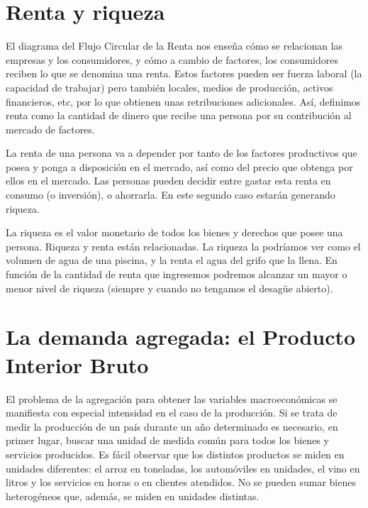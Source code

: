 \documentclass[
]{krantz}
\begin{document}
\hypertarget{renta-y-riqueza}{%
\section{Renta y riqueza}\label{renta-y-riqueza}}

El diagrama del Flujo Circular de la Renta nos enseña cómo se relacionan las empresas y los consumidores, y cómo a cambio de factores, los consumidores reciben lo que se denomina una renta. Estos factores pueden ser fuerza laboral (la capacidad de trabajar) pero también locales, medios de producción, activos financieros, etc, por lo que obtienen unas retribuciones adicionales. Así, definimos renta como la cantidad de dinero que recibe una persona por su contribución al mercado de factores.

La renta de una persona va a depender por tanto de los factores productivos que posea y ponga a disposición en el mercado, así como del precio que obtenga por ellos en el mercado. Las personas pueden decidir entre gastar esta renta en consumo (o inversión), o ahorrarla. En este segundo caso estarán generando riqueza.

La riqueza es el valor monetario de todos los bienes y derechos que posee una persona. Riqueza y renta están relacionadas. La riqueza la podríamos ver como el volumen de agua de una piscina, y la renta el agua del grifo que la llena. En función de la cantidad de renta que ingresemos podremos alcanzar un mayor o menor nivel de riqueza (siempre y cuando no tengamos el desagüe abierto).

\hypertarget{la-demanda-agregada-el-producto-interior-bruto}{%
\section{La demanda agregada: el Producto Interior Bruto}\label{la-demanda-agregada-el-producto-interior-bruto}}

El problema de la agregación para obtener las variables macroeconómicas se manifiesta con especial intensidad en el caso de la producción. Si se trata de medir la producción de un país durante un año determinado es necesario, en primer lugar, buscar una unidad de medida común para todos los bienes y servicios producidos. Es fácil observar que los distintos productos se miden en unidades diferentes: el arroz en toneladas, los automóviles en unidades, el vino en litros y los servicios en horas o en clientes atendidos. No se pueden sumar bienes heterogéneos que, además, se miden en unidades distintas.
\end{document}
